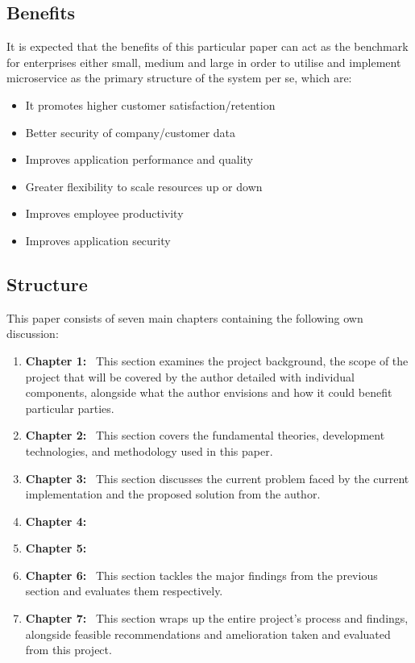 \documentclass[conference, a4paper]{IEEEtran}
\begin{document}
\subsection{Benefits}
\label{sec:sub:title}
It is expected that the benefits of this particular paper can act as the benchmark for enterprises either small, medium and large in order to utilise and implement microservice as the primary structure of the system per se, which are:

\begin{itemize}
    \item It promotes higher customer satisfaction/retention
    \item Better security of company/customer data
    \item Improves application performance and quality
    \item Greater flexibility to scale resources up or down
    \item Improves employee productivity
    \item Improves application security
    
\end{itemize}


\subsection{Structure}
\label{sec:sub:title}
This paper consists of seven main chapters containing the following own discussion: 

\begin{enumerate}
    \item {\bf Chapter 1:} \text\ This section examines the project background, the scope of the project that will be covered by the author detailed with individual components, alongside what the author envisions and how it could benefit particular parties.
    \item {\bf Chapter 2:} \text\ This section covers the fundamental theories, development technologies, and methodology used in this paper.
    \item {\bf Chapter 3:} \text\ This section discusses the current problem faced by the current
    implementation and the proposed solution from the author.
    \item {\bf Chapter 4:} \text\ 
    \item {\bf Chapter 5:} \text\ 
    \item {\bf Chapter 6:} \text\ This section tackles the major findings from the previous section and
    evaluates them respectively.
    \item {\bf Chapter 7:} \text\ This section wraps up the entire project's process and findings, alongside feasible recommendations and amelioration taken and evaluated from this project.
\end{enumerate}
\end{document}
